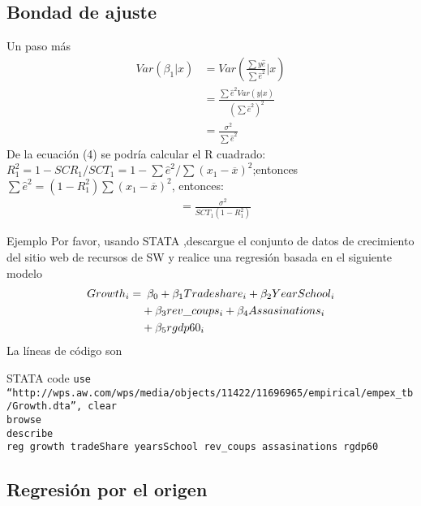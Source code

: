 \subsection{Bondad de ajuste}
\begin{frame}{Un paso más}
	\begin{align}
		Var(\beta_1|x) & = Var(\frac{\sum y \hat e}{\sum \hat{e}^2}|x) \\
		& = \frac{\sum \hat{e}^2 Var (y|x)}{(\sum \hat e^2)^2} \\
		& = \frac{\sigma^2}{\sum \hat{e}^2}
	\end{align}
	De la ecuación (4) se podría calcular el R cuadrado:\\
	$R^2_1=1-SCR_1/SCT_1=1-\sum \hat{e}^2/\sum (x_1-\overline{x})^2$;entonces\\
	$\sum \hat{e}^2=(1-R_1^2)\sum(x_1-\overline{x})^2$,
	entonces:\\
	\begin{align}
		&= \frac{\sigma^2}{SCT_1(1-R_1^2)}
	\end{align}
\end{frame}	
\begin{frame}[fragile]{Ejemplo}
	Por favor, usando STATA ,descargue el conjunto de datos de crecimiento del sitio web de recursos de SW y realice una regresión basada en el siguiente modelo
		\begin{align*}
			Growth_i  = & \enskip  \beta_0 + \beta_1Tradeshare_i + \beta_2YearSchool_i\\
			& + \beta_3rev\_coups_i + \beta_4Assasinations_i \\
			& + \beta_5rgdp60_i
		\end{align*}
	La líneas de código son\\
		\begin{Stata code}{STATA code}
			{\tiny
				\texttt{\textcolor{codeblue}{use} \textcolor{codecrimson}{\textquotedblleft http://wps.aw.com/wps/media/objects/11422/11696965/empirical/empex\_tb/Growth.dta\textquotedblright}, clear}\\
				\texttt{\textcolor{codeblue}{browse}}\\
				\texttt{\textcolor{codeblue}{describe}}\\
				\texttt{\textcolor{codeblue}{reg} growth tradeShare yearsSchool rev\_coups assasinations rgdp60}}
		\end{Stata code}
\end{frame}

\subsection{Regresión por el origen}
